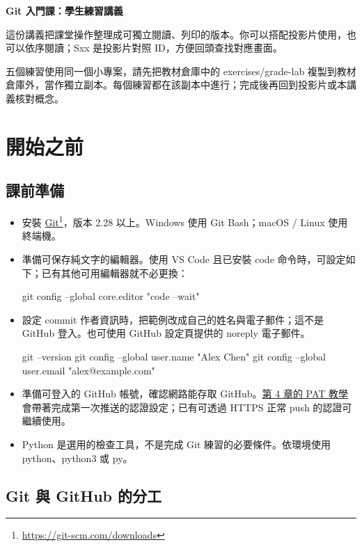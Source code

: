 \documentclass[11pt,a4paper]{article}
\DeclareRobustCommand{\code}[1]{{\small\ttfamily #1}}
\begin{document}
\begin{center}
    {\LARGE\bfseries\color{handoutaccent} Git 入門課：學生練習講義\par}
\end{center}

這份講義把課堂操作整理成可獨立閱讀、列印的版本。你可以搭配投影片使用，也可以依序閱讀；Sxx 是投影片對照 ID，方便回頭查找對應畫面。

五個練習使用同一個小專案，請先把教材倉庫中的 \code{exercises/grade-lab} 複製到教材倉庫外，當作獨立副本。每個練習都在該副本中進行；完成後再回到投影片或本講義核對概念。

\section{開始之前}

\subsection{課前準備}

\begin{itemize}
    \item 安裝 \href{https://git-scm.com/downloads}{Git}\footnote{\url{https://git-scm.com/downloads}}，版本 2.28 以上。Windows 使用 Git Bash；macOS / Linux 使用終端機。
    \item 準備可保存純文字的編輯器。使用 VS Code 且已安裝 \code{code} 命令時，可設定如下；已有其他可用編輯器就不必更換：
\begin{Code}
git config --global core.editor "code --wait"
\end{Code}
    \item 設定 commit 作者資訊時，把範例改成自己的姓名與電子郵件；這不是 GitHub 登入。也可使用 GitHub 設定頁提供的 noreply 電子郵件。
\begin{Code}
git --version
git config --global user.name "Alex Chen"
git config --global user.email "alex@example.com"
\end{Code}
    \item 準備可登入的 GitHub 帳號，確認網路能存取 GitHub。\hyperref[guide:pat]{第 4 章的 PAT 教學}會帶著完成第一次推送的認證設定；已有可透過 HTTPS 正常 \code{push} 的認證可繼續使用。
    \item Python 是選用的檢查工具，不是完成 Git 練習的必要條件。依環境使用 \code{python}、\code{python3} 或 \code{py}。
\end{itemize}

\subsection{Git 與 GitHub 的分工}
\end{document}
